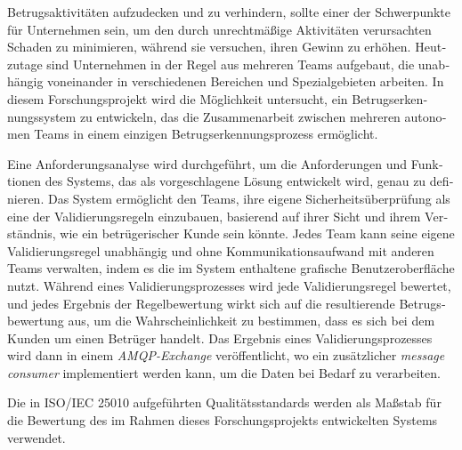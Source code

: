 \begin{otherlanguage}{ngerman}
Betrugsaktivit\"aten aufzudecken und zu verhindern, sollte einer der Schwerpunkte f\"ur Unternehmen sein, um den durch unrechtm\"a{\ss}ige Aktivit\"aten verursachten Schaden zu minimieren, w\"ahrend sie versuchen, ihren Gewinn zu erh\"ohen. Heutzutage sind Unternehmen in der Regel aus mehreren Teams aufgebaut, die unabh\"angig voneinander in verschiedenen Bereichen und Spezialgebieten arbeiten. In diesem Forschungsprojekt wird die M\"oglichkeit untersucht, ein Betrugserkennungssystem zu entwickeln, das die Zusammenarbeit zwischen mehreren autonomen Teams in einem einzigen Betrugserkennungsprozess erm\"oglicht. 

Eine Anforderungsanalyse wird durchgef\"uhrt, um die Anforderungen und Funktionen des Systems, das als vorgeschlagene L\"osung entwickelt wird, genau zu definieren. Das System erm\"oglicht den Teams, ihre eigene Sicherheits\"uberpr\"ufung als eine der Validierungsregeln einzubauen, basierend auf ihrer Sicht und ihrem Verst\"andnis, wie ein betr\"ugerischer Kunde sein k\"onnte. Jedes Team kann seine eigene Validierungsregel unabh\"angig und ohne Kommunikationsaufwand mit anderen Teams verwalten, indem es die im System enthaltene grafische Benutzeroberfl\"ache nutzt. W\"ahrend eines Validierungsprozesses wird jede Validierungsregel bewertet, und jedes Ergebnis der Regelbewertung wirkt sich auf die resultierende Betrugsbewertung aus, um die Wahrscheinlichkeit zu bestimmen, dass es sich bei dem Kunden um einen Betr\"uger handelt. Das Ergebnis eines Validierungsprozesses wird dann in einem \emph{AMQP-Exchange} ver\"offentlicht, wo ein zus\"atzlicher \emph{message consumer} implementiert werden kann, um die Daten bei Bedarf zu verarbeiten.

Die in ISO/IEC 25010 aufgef\"uhrten Qualit\"atsstandards werden als Ma{\ss}stab f\"ur die Bewertung des im Rahmen dieses Forschungsprojekts entwickelten Systems verwendet. 
\end{otherlanguage}